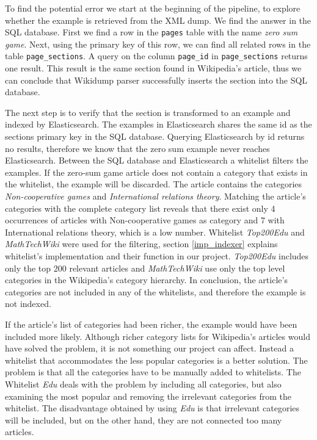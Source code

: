 To find the potential error we start at the beginning of the pipeline, to explore whether the example is retrieved from the XML dump. We find the answer in the SQL database. First we find a row in the \texttt{pages} table with the name \textit{zero sum game}. Next, using the primary key of this row, we can find all related rows in the table \texttt{page\_sections}. A query on the column \texttt{page\_id} in \texttt{page\_sections} returns one result. This result is the same section found in Wikipedia's article, thus we can conclude that Wikidump parser successfully inserts the section into the SQL database.

The next step is to verify that the section is transformed to an example and indexed by Elasticsearch. The examples in Elasticsearch shares the same id as the sections primary key in the SQL database. Querying Elasticsearch by id returns no results, therefore we know that the zero sum example never reaches Elasticsearch. Between the SQL database and Elasticsearch a whitelist filters the examples. If the zero-sum game article does not contain a category that exists in the whitelist, the example will be discarded. The article contains the categories \textit{Non-cooperative games} and \textit{International relations theory}. Matching the article's categories with the complete category list reveals that there exist only 4 occurrences of articles with Non-cooperative games as category and 7 with International relations theory, which is a low number. Whitelist \textit{Top200Edu} and \textit{MathTechWiki} were used for the filtering, section \ref{imp_indexer} explains whitelist's implementation and their function in our project. \textit{Top200Edu} includes only the top 200 relevant articles and \textit{MathTechWiki} use only the top level categories in the Wikipedia's category hierarchy. In conclusion, the article's categories are not included in any of the whitelists, and therefore the example is not indexed.

If the article's list of categories had been richer, the example would have been included more likely. Although richer category lists for Wikipedia's articles would have solved the problem, it is not something our project can affect. Instead a whitelist that accommodates the less popular categories is a better solution. The problem is that all the categories have to be manually added to whitelists. The Whitelist \textit{Edu} deals with the problem by including all categories, but also examining the most popular and removing the irrelevant categories from the whitelist. The disadvantage obtained by using \textit{Edu} is that irrelevant categories will be included, but on the other hand, they are not connected too many articles. 

